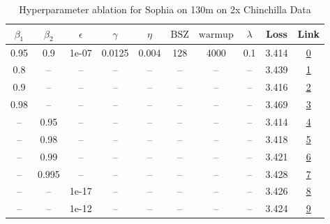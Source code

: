 \begin{table}[H]
\centering
\caption{Hyperparameter ablation for Sophia on 130m on 2x Chinchilla Data}
\label{tab:ablation_sophia_130m_2}
\begin{tabular}{cccccccccc}
\toprule
$\beta_1$ & $\beta_2$ & $\epsilon$ & $\gamma$ & $\eta$ & $\mathrm{BSZ}$ & $\mathrm{warmup}$ & $\lambda$ & Loss & Link \\
\midrule
0.95 & 0.9 & 1e-07 & 0.0125 & 0.004 & 128 & 4000 & 0.1 & 3.414 & \href{https://wandb.ai/stanford-mercury/optimizer-scaling/runs/sweep-130m-5B-sophiaf95b3dlr0.004-wd0.1-minlr0-warmup4000-b10.95-187352}{0} \\
\midrule
0.8 & -- & -- & -- & -- & -- & -- & -- & 3.439 & \href{https://wandb.ai/stanford-mercury/optimizer-scaling/runs/sweep-130m-5B-sophia282c09lr0.004-wd0.1-minlr0-warmup4000-b10.8--b60356}{1} \\
0.9 & -- & -- & -- & -- & -- & -- & -- & 3.416 & \href{https://wandb.ai/stanford-mercury/optimizer-scaling/runs/sweep-130m-5B-sophiae5887flr0.004-wd0.1-minlr0-warmup4000-b10.9--0010c1}{2} \\
0.98 & -- & -- & -- & -- & -- & -- & -- & 3.469 & \href{https://wandb.ai/stanford-mercury/optimizer-scaling/runs/sweep-130m-5B-sophiad61acalr0.004-wd0.1-minlr0-warmup4000-b10.98-0311d7}{3} \\
-- & 0.95 & -- & -- & -- & -- & -- & -- & 3.414 & \href{https://wandb.ai/stanford-mercury/optimizer-scaling/runs/sweep-130m-5B-sophia27d93clr0.004-wd0.1-minlr0-warmup4000-b10.95-0c4238}{4} \\
-- & 0.98 & -- & -- & -- & -- & -- & -- & 3.418 & \href{https://wandb.ai/stanford-mercury/optimizer-scaling/runs/sweep-130m-5B-sophiad1cb34lr0.004-wd0.1-minlr0-warmup4000-b10.95-298f3a}{5} \\
-- & 0.99 & -- & -- & -- & -- & -- & -- & 3.421 & \href{https://wandb.ai/stanford-mercury/optimizer-scaling/runs/sweep-130m-5B-sophia7b63b9lr0.004-wd0.1-minlr0-warmup4000-b10.95-48c5c4}{6} \\
-- & 0.995 & -- & -- & -- & -- & -- & -- & 3.428 & \href{https://wandb.ai/stanford-mercury/optimizer-scaling/runs/sweep-130m-5B-sophiad39f61lr0.004-wd0.1-minlr0-warmup4000-b10.95-0b896b}{7} \\
-- & -- & 1e-17 & -- & -- & -- & -- & -- & 3.426 & \href{https://wandb.ai/stanford-mercury/optimizer-scaling/runs/sweep-130m-5B-sophia22c55alr0.004-wd0.1-minlr0-warmup4000-b10.95-a869ea}{8} \\
-- & -- & 1e-12 & -- & -- & -- & -- & -- & 3.424 & \href{https://wandb.ai/stanford-mercury/optimizer-scaling/runs/sweep-130m-5B-sophia67c9f3lr0.004-wd0.1-minlr0-warmup4000-b10.95-c0203d}{9} \\

\end{tabular}
\end{table}
